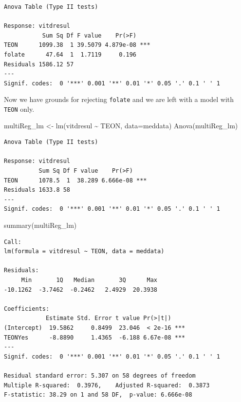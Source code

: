 \documentclass[
  oneside]{krantz}
\newenvironment{Shaded}{\begin{snugshade}}{\end{snugshade}}
\newcommand{\AttributeTok}[1]{\textcolor[rgb]{0.77,0.63,0.00}{#1}}
\newcommand{\FunctionTok}[1]{\textcolor[rgb]{0.00,0.00,0.00}{#1}}
\newcommand{\NormalTok}[1]{#1}
\newcommand{\OtherTok}[1]{\textcolor[rgb]{0.56,0.35,0.01}{#1}}
\newcommand{\SpecialCharTok}[1]{\textcolor[rgb]{0.00,0.00,0.00}{#1}}
\begin{document}
\begin{verbatim}
Anova Table (Type II tests)

Response: vitdresul
           Sum Sq Df F value    Pr(>F)    
TEON      1099.38  1 39.5079 4.879e-08 ***
folate      47.64  1  1.7119     0.196    
Residuals 1586.12 57                      
---
Signif. codes:  0 '***' 0.001 '**' 0.01 '*' 0.05 '.' 0.1 ' ' 1
\end{verbatim}

Now we have grounds for rejecting \texttt{folate} and we are left with a model with \texttt{TEON} only.

\begin{Shaded}
\begin{Highlighting}[]
\NormalTok{multiReg\_lm }\OtherTok{\textless{}{-}} \FunctionTok{lm}\NormalTok{(vitdresul }\SpecialCharTok{\textasciitilde{}}\NormalTok{ TEON, }\AttributeTok{data=}\NormalTok{meddata)}
\FunctionTok{Anova}\NormalTok{(multiReg\_lm)}
\end{Highlighting}
\end{Shaded}

\begin{verbatim}
Anova Table (Type II tests)

Response: vitdresul
          Sum Sq Df F value    Pr(>F)    
TEON      1078.5  1  38.289 6.666e-08 ***
Residuals 1633.8 58                      
---
Signif. codes:  0 '***' 0.001 '**' 0.01 '*' 0.05 '.' 0.1 ' ' 1
\end{verbatim}

\begin{Shaded}
\begin{Highlighting}[]
\FunctionTok{summary}\NormalTok{(multiReg\_lm)}
\end{Highlighting}
\end{Shaded}

\begin{verbatim}
Call:
lm(formula = vitdresul ~ TEON, data = meddata)

Residuals:
     Min       1Q   Median       3Q      Max 
-10.1262  -3.7462  -0.2462   2.4929  20.3938 

Coefficients:
            Estimate Std. Error t value Pr(>|t|)    
(Intercept)  19.5862     0.8499  23.046  < 2e-16 ***
TEONYes      -8.8890     1.4365  -6.188 6.67e-08 ***
---
Signif. codes:  0 '***' 0.001 '**' 0.01 '*' 0.05 '.' 0.1 ' ' 1

Residual standard error: 5.307 on 58 degrees of freedom
Multiple R-squared:  0.3976,    Adjusted R-squared:  0.3873 
F-statistic: 38.29 on 1 and 58 DF,  p-value: 6.666e-08
\end{verbatim}
\end{document}
